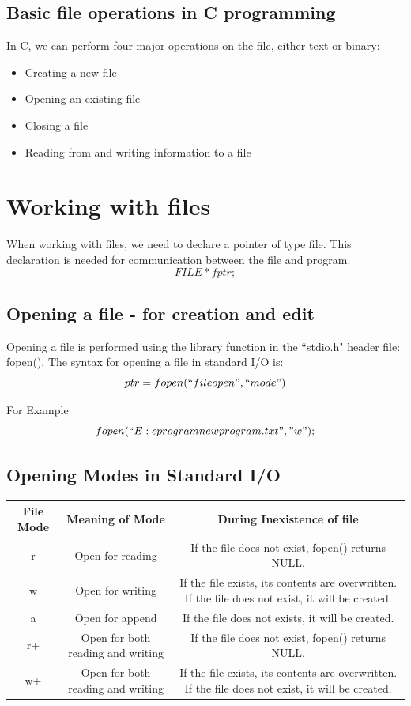 \documentclass[12pt, a4paper, titlepage]{article}
\begin{document}
\subsection{Basic file operations in C programming}
In C, we can perform four major operations on the file, either text or binary:
\begin{itemize}
	\item Creating a new file
    \item Opening an existing file
    \item Closing a file
    \item Reading from and writing information to a file

\end{itemize}

\section{Working with files}

When working with files, we need to declare a pointer of type file. This declaration is needed for communication between the file and program.
\[
	FILE *fptr;
\]
   
\subsection{Opening a file - for creation and edit} 
Opening a file is performed using the library function in the ``stdio.h" header file: fopen().
The syntax for opening a file in standard I/O is:
\[
ptr = fopen(``fileopen",``mode")
\]

For Example
\[
fopen(``E:\\cprogram\\newprogram.txt","w");
\]

\subsection{Opening Modes in Standard I/O}



\begin{center}
 \begin{tabular}{||c c c||} 
 \hline
 File Mode & Meaning of Mode & During Inexistence of file \\ [0.5ex] 
 \hline\hline
 r & Open for reading & If the file does not exist, fopen() returns NULL. \\ 
 \hline
 w & Open for writing & If the file exists, its contents are overwritten. If the file does not exist, it will be created. \\
 \hline
 a & Open for append & If the file does not exists, it will be created. \\
 \hline
 r+ & Open for both reading and writing & If the file does not exist, fopen() returns NULL.\\
 \hline
 w+ & Open for both reading and writing & If the file exists, its contents are overwritten. If the file does not exist, it will be created.\\ [1ex] 
 \hline
\end{tabular}
\end{center}
\end{document}
